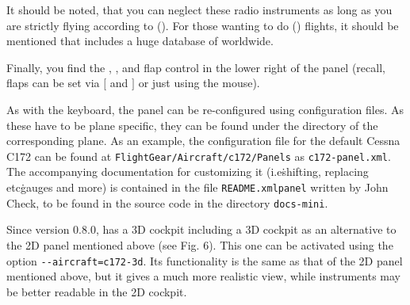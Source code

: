 It should be noted, that you can neglect these radio instruments as
long as you are strictly flying according to  (). For those wanting to do  () flights, it should be mentioned that \FlightGear{}
includes a huge database of  worldwide.

Finally, you find the , , and flap control in
the lower right of the panel (recall, flaps can be set via $[$ and $]$ or just using the mouse).

As with the keyboard, the panel can be re-configured using
configuration files. As these have to be plane specific, they can be found under the
directory of the corresponding plane. As an example, the configuration file for the
default Cessna C172 can be found at \texttt{FlightGear/Aircraft/c172/Panels} as
\texttt{c172-panel.xml}. The accompanying documentation for customizing it (i.e\. shifting,
replacing etc\. gauges and more) is contained in the file \texttt{README.xmlpanel} written by John Check,
to be found in the source code in the directory \texttt{docs-mini}.

Since version 0.8.0, \FlightGear{} has a 3D cockpit including a 3D
cockpit as an alternative to the 2D panel mentioned above (see Fig. 6).
This one can be activated using the option \texttt{-$
$-aircraft=c172-3d}. Its functionality is the same as that of the 2D
panel mentioned above, but it gives a much more realistic view, while
instruments may be better readable in the 2D cockpit.
\medskip

 \centerline{}

